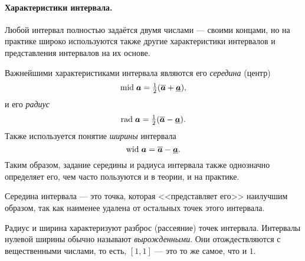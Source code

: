 \documentclass[a5paper,openany]{book}
\newcommand{\mbf}[1]{\protect\text{\boldmath$#1$}}
\newcommand{\mbb}{\mathbb}
\newcommand{\ov}{\overline}
\newcommand{\un}{\underline}
\newcommand{\m}{\mathrm{mid}\;}
\newcommand{\w}{\mathrm{wid}\;}
\newcommand{\dist}{\mathrm{dist}\,}
\renewcommand{\r}{\mathrm{rad}\;}
\begin{document}
\paragraph{Характеристики интервала.} 
Любой интервал полностью задаётся двумя числами --- своими концами, но на практике 
широко используются также другие характеристики интервалов и представления интервалов 
на их основе. 

Важнейшими характеристиками интервала являются его \emph{середина} (центр) 
\begin{equation*}
\textstyle\index{середина интервала} 
\m\mbf{a} = \frac{1}{2}(\ov{\mbf{a}} + \un{\mbf{a}}),
\end{equation*}
и его \emph{радиус} 
\begin{equation*}
\textstyle\index{радиус интервала} 
\r\mbf{a} = \frac{1}{2}(\ov{\mbf{a}} - \un{\mbf{a}}).
\end{equation*} 
Также используется понятие \emph{ширины} 
интервала   \label{InteWid}
\begin{equation*}
\w\mbf{a} = \ov{\mbf{a}} - \un{\mbf{a}}. 
\end{equation*}
Таким образом, задание середины и радиуса интервала также однозначно определяет его, 
чем часто пользуются и в теории, и на практике. 

Середина интервала --- это точка, которая <<представляет его>> наилучшим образом, 
так как наименее удалена от остальных точек этого интервала. 

Радиус и ширина характеризуют разброс (рассеяние) точек интервала. 
Интервалы нулевой ширины обычно называют  \textit{вырожденными}. Они отождествляются с вещественными числами, то есть, 
$[1, 1]$ --- это то же самое, что и $1$. 


\end{document}
